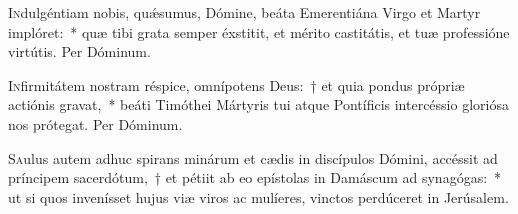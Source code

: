 \documentclass[vesperale_romanum.tex]{subfiles}
\begin{document}

\oratio

\lettrine{I}{n}dulgéntiam nobis, quǽsumus, Dómine, beáta Emerentiána Virgo et Martyr implóret:~* quæ tibi grata semper éxstitit, et mérito castitátis, et tuæ professióne virtútis. Per Dóminum.

\vespsequentiscomm

\myrule

\newpage
{}

\duplex

\oratio

\lettrine{I}{n}firmitátem nostram réspice, omnípotens Deus:~† et quia pondus própriæ actiónis gravat,~* beáti Timóthei Mártyris tui atque Pontíficis intercéssio gloriósa nos prótegat.
Per Dóminum.



\myrule
{}

\duplexmajus


\label{109_8G_jan}










\lettrine{S}{a}ulus autem adhuc spirans minárum et cædis in discípulos Dómini, accéssit ad príncipem sacerdótum,~† et pétiit ab eo epístolas in Damáscum ad synagógas:~* ut si quos invenísset hujus viæ viros ac mulíeres, vinctos perdúceret in Jerúsalem.
\end{document}
